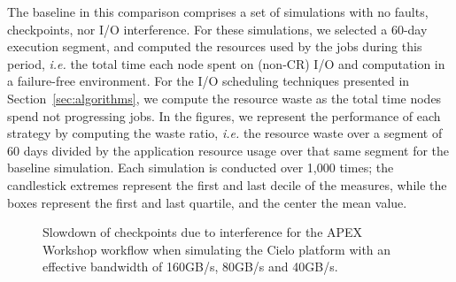 \documentclass[conference,nofonttune]{IEEEtran}
\newcommand{\ie}[0]{\emph{i.e.}\xspace}
\begin{document}
\begin{table}
\centering
{}
\caption{LANL Workflow Workload from the APEX Workflows report.\label{table:lanl}}
\end{table}

The baseline in this comparison comprises a set of simulations with no faults,
checkpoints, nor I/O interference. For these simulations, we selected a 60-day
execution segment, and computed the resources used by the jobs during this
period, \ie the total time each node spent on (non-CR) I/O and computation in a
failure-free environment.
For the I/O scheduling techniques presented in Section~\ref{sec:algorithms}, we
compute the resource waste as the total time nodes spend not progressing jobs.
In the figures, we represent the performance of each strategy by
computing the waste ratio, \ie the resource waste over a segment of 60 days
divided by the application resource usage over that same segment for the
baseline simulation. Each simulation is conducted over 1,000 times; the
candlestick extremes represent the first and last decile of the measures, while
the boxes represent the first and last quartile, and the center the mean value.

\begin{figure}[t]
  \begin{center}
    \resizebox{1.05\linewidth}{!}{}
 \end{center}
    \caption{\label{fig:ckps-slow}Slowdown of checkpoints due to
      interference for the APEX Workshop workflow when simulating the
      Cielo platform with an effective bandwidth of 160GB/s, 80GB/s
      and 40GB/s.}
 \end{figure}
\end{document}
